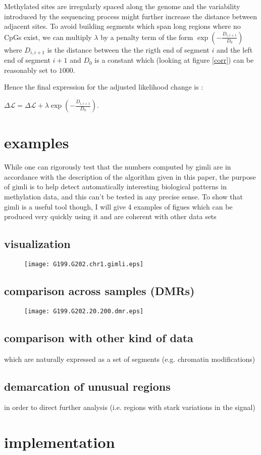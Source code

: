 \documentclass[11pt]{amsart}
\newcommand{\lik}{\ensuremath{\mathcal{L}}}
\begin{document}
Methylated sites are irregularly spaced along the genome and the variability 
introduced by the sequencing process might further increase the distance 
between adjacent sites.
To avoid building segments which span long regions where no CpGs exist, we 
can multiply $\lambda$ by a penalty term of the
form $\exp(-\frac{D_{i,i+1}}{D_0})$ where $D_{i,i+1}$ is the distance 
between the the rigth end of segment $i$ and the left end of segment $i+1$ and 
$D_0$ is a constant which (looking at figure \ref{corr}) can be reasonably 
set to $1000$. 

Hence the final expression for the adjusted likelihood change is :

$\Delta \lik = \Delta \lik+\lambda \exp(-\frac{D_{i,i+1}}{D_0}) $.

\section{examples}

While one can rigorously test that the numbers computed by gimli are in 
accordance with the description
of the algorithm given in this paper, the purpose of gimli is to help 
detect automatically interesting
biological patterns in methylation data, and this can't be tested in any 
precise sense. To show that gimli is a useful tool
though, I will give 4 examples of figues which can be produced very quickly
using it and are coherent with other data sets

\subsection{visualization}

\begin{figure}\label{ex1}
\texttt{[image: G199.G202.chr1.gimli.eps]}
\end{figure}

\subsection{comparison across samples (DMRs)}

\begin{figure}\label{ex1}
\texttt{[image: G199.G202.20.200.dmr.eps]}
\end{figure}

\subsection{comparison with other kind of data}

which are naturally expressed as a set of 
segments (e.g. chromatin modifications)

\subsection{demarcation of unusual regions} 
in order to direct further analysis 
(i.e. regions with stark variations in the signal)

\section{implementation}



\end{document}
